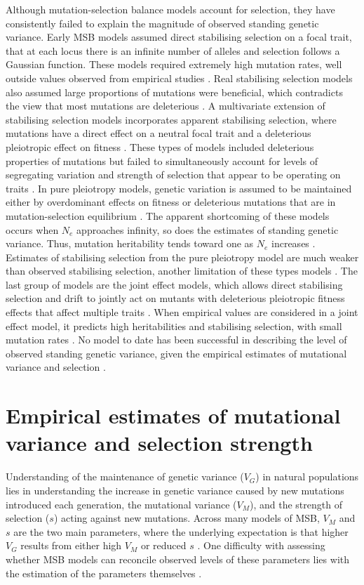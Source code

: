 Although mutation-selection balance models account for selection, they have consistently failed to explain the magnitude of observed standing genetic variance. Early MSB models assumed direct stabilising selection on a focal trait, that at each locus there is an infinite number of alleles and selection follows a Gaussian function. These models required extremely high mutation rates, well outside values observed from empirical studies \citep{Land75, Ture84}. Real stabilising selection models also assumed large proportions of mutations were beneficial, which contradicts the view that most mutations are deleterious \citep{Kond92}. A multivariate extension of stabilising selection models incorporates apparent stabilising selection, where mutations have a direct effect on a neutral focal trait and a deleterious pleiotropic effect on fitness \citep{Ture85, Bart90, Zhan03}. These types of models included deleterious properties of mutations but failed to simultaneously account for levels of segregating variation and strength of selection that appear to be operating on traits \citep{John05}. In pure pleiotropy models, genetic variation is assumed to be maintained either by overdominant effects on fitness or deleterious mutations that are in mutation-selection equilibrium \citep{John05}. The apparent shortcoming of these models occurs when $N_e$ approaches infinity, so does the estimates of standing genetic variance. Thus, mutation heritability tends toward one as $N_e$ increases \citep{Caba94}. Estimates of stabilising selection from the pure pleiotropy model are much weaker than observed stabilising selection, another limitation of these types models \citep{Wals18c28}. The last group of models are the joint effect models, which allows direct stabilising selection and drift to jointly act on mutants with deleterious pleiotropic fitness effects that affect multiple traits \citep{Zhan02}. When empirical values are considered in a joint effect model, it predicts high heritabilities and stabilising selection, with small mutation rates \citep{Zhan02}. No model to date has been successful in describing the level of observed standing genetic variance, given the empirical estimates of mutational variance and selection \citep{John05, Houl17}.\par    

\section{Empirical estimates of mutational variance and selection strength} 
Understanding of the maintenance of genetic variance ($V_G$) in natural populations lies in understanding the increase in genetic variance caused by new mutations introduced each generation, the mutational variance ($V_M$), and the strength of selection ($s$) acting against new mutations.  Across many models of MSB, $V_M$ and $s$ are the two main parameters, where the underlying expectation is that higher $V_G$ results from either high $V_M$ or reduced $s$ \citep{Lync99}. One difficulty with assessing whether MSB models can reconcile observed levels of these parameters lies with the estimation of the parameters themselves \citep{Wals18c28}. \par

